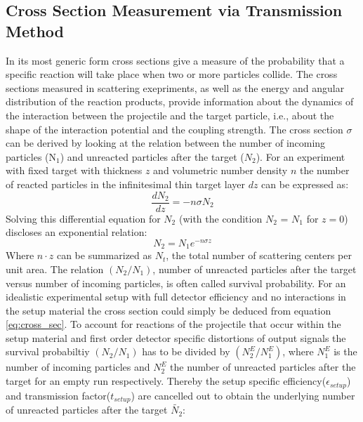 \subsection{Cross Section Measurement via Transmission Method}\label{section:transmission_method}
In its most generic form cross sections give a measure of the probability that a specific reaction will take place when two or more particles collide. The cross sections  measured in scattering exepriments, as well as the energy and angular distribution of the reaction products, provide information about the dynamics of the interaction between the projectile and the target particle, i.e., about the shape of the interaction potential and the coupling strength.\newline
The cross section $\sigma$ can be derived by looking at the relation between the number of incoming particles (N$_{1}$) and unreacted particles after the target ($N_{2}$). For an experiment with fixed target with thickness $z$ and volumetric number density $n$ the number of reacted particles in the infinitesimal thin target layer $dz$ can be expressed as:
\begin{equation}
\frac{dN_{2}}{dz} = -n \sigma N_{2}
\end{equation}
Solving this differential equation for $N_{2}$ (with the condition $N_{2}$ = $N_{1}$ for $z=0$) discloses an exponential relation:
\begin{equation}
N_{2} = N_{1}e^{-n\sigma z}
\label{eq:cross_sec}
\end{equation} 
Where $n\cdot z$ can be summarized as $N_t$, the total number of scattering centers per unit area. The relation $(N_{2}/N_{1})$, number of unreacted particles after the target versus number of incoming particles, is often called survival probability. For an idealistic experimental setup with full detector efficiency and no interactions in the setup material the cross section could simply be deduced from equation \ref{eq:cross_sec}. To account for reactions of the projectile that occur within the setup material and first order detector specific distortions of output signals the survival probabiltiy $(N_{2}/N_{1})$ has to be divided by $(N_{2}^E/N_{1}^E)$, where $N_{1}^E$ is the number of incoming particles and $N_{2}^E$ the number of unreacted particles after the target for an empty run respectively. Thereby the setup specific efficiency($\epsilon_{setup}$) and transmission factor($t_{setup}$) are cancelled out to obtain the underlying number of unreacted particles after the target $\tilde{N_{2}}$:\newline

